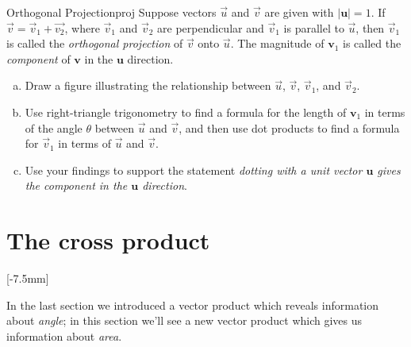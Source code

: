 \documentclass{watsonbook}
\begin{document}
\begin{exercise}{Orthogonal Projection}{proj}
  Suppose vectors $\vec{u}$ and $\vec{v}$ are given with
  $|\mathbf{u}| = 1$. If $\vec{v} = \vec{v}_1 + \vec{v_2}$, where
  $\vec{v}_1$ and $\vec{v}_2$ are perpendicular and $\vec{v}_1$ is
  parallel to $\vec{u}$, then $\vec{v}_1$ is called the
  \textit{orthogonal projection} of $\vec{v}$ onto $\vec{u}$. The
  magnitude of $\mathbf{v}_1$ is called the \textit{component} of
  $\mathbf{v}$ in the $\mathbf{u}$ direction.

  \begin{enumerate}[(a)]
  \item Draw a figure illustrating the relationship between $\vec{u}$,
    $\vec{v}$, $\vec{v}_1$, and $\vec{v}_2$. 

  \item Use right-triangle trigonometry to find a formula for the
    length of $\mathbf{v}_1$ in terms of the angle $\theta$ between
    $\vec{u}$ and $\vec{v}$, and then use dot products to find a
    formula for $\vec{v}_1$ in terms of $\vec{u}$ and $\vec{v}$.

  \item Use your findings to support the statement \textit{dotting
      with a unit vector $\mathbf{u}$ gives the component in the
      $\mathbf{u}$ direction}. 
  \end{enumerate}
\end{exercise}

\section{The cross product} \label{sec:cross} 

[-7.5mm]

In the last section we introduced a vector product which reveals
information about \textit{angle}; in this section we'll see a new
vector product which gives us information about \textit{area}.
\end{document}
